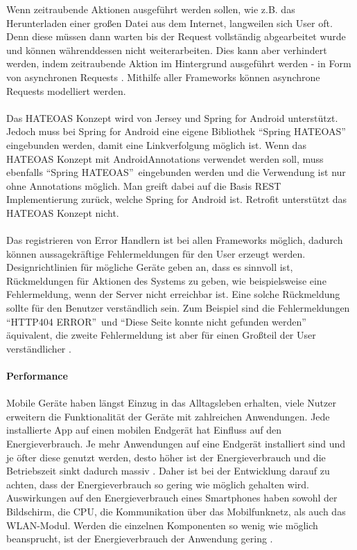 Wenn zeitraubende Aktionen ausgeführt werden sollen, wie z.B. das Herunterladen einer großen Datei aus dem Internet, langweilen sich User oft. Denn diese müssen dann warten bis der Request vollständig abgearbeitet wurde und können währenddessen nicht weiterarbeiten. Dies kann aber verhindert werden, indem zeitraubende Aktion im Hintergrund ausgeführt werden - in Form von asynchronen Requests \cite{louis:android}. Mithilfe aller Frameworks können asynchrone Requests modelliert werden. 
\\\\
Das HATEOAS Konzept wird von Jersey und Spring for Android unterstützt. Jedoch muss bei Spring for Android eine eigene Bibliothek \textquotedblleft Spring HATEOAS\textquotedblright\, eingebunden werden, damit eine Linkverfolgung möglich ist. Wenn das HATEOAS Konzept mit AndroidAnnotations verwendet werden soll, muss ebenfalls \textquotedblleft Spring HATEOAS\textquotedblright\, eingebunden werden und die Verwendung ist nur ohne Annotations möglich. Man greift dabei auf die Basis REST Implementierung zurück, welche Spring for Android ist. Retrofit unterstützt das HATEOAS Konzept nicht.
\\\\
Das registrieren von Error Handlern ist bei allen Frameworks möglich, dadurch können aussagekräftige Fehlermeldungen für den User erzeugt werden. Designrichtlinien für mögliche Geräte geben an, dass es sinnvoll ist, Rückmeldungen für Aktionen des Systems zu geben, wie beispielsweise eine Fehlermeldung, wenn der Server nicht erreichbar ist. Eine solche Rückmeldung sollte für den Benutzer verständlich sein. Zum Beispiel sind die Fehlermeldungen \textquotedblleft HTTP404 ERROR\textquotedblright\, und \textquotedblleft Diese Seite konnte nicht gefunden werden\textquotedblright\, äquivalent, die zweite Fehlermeldung ist aber für einen Großteil der User verständlicher \cite{gong2004guidelines}.
\\\\
{\large \textbf{Performance}}\\\\
Mobile Geräte haben längst Einzug in das Alltagsleben erhalten, viele Nutzer erweitern die Funktionalität der Geräte mit zahlreichen Anwendungen. Jede installierte App auf einen mobilen Endgerät hat Einfluss auf den Energieverbrauch. Je mehr Anwendungen auf eine Endgerät installiert sind und je öfter diese genutzt werden, desto höher ist der Energieverbrauch und die Betriebszeit sinkt dadurch massiv \cite{Wil2012}. Daher ist bei der Entwicklung darauf zu achten, dass der Energieverbrauch so gering wie möglich gehalten wird. Auswirkungen auf den Energieverbrauch eines Smartphones haben sowohl der Bildschirm, die \acrfull{CPU}, die Kommunikation über das Mobilfunknetz, als auch das WLAN-Modul. Werden die einzelnen Komponenten so wenig wie möglich beansprucht, ist der Energieverbrauch der Anwendung gering \cite{vetter}. 
